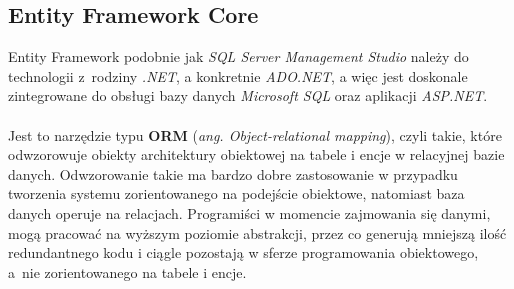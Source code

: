     \subsection{Entity Framework Core}
\quad Entity Framework podobnie jak \textit{SQL Server Management Studio} należy do technologii z~rodziny \textit{.NET}, a konkretnie \textit{ADO.NET}, a więc jest doskonale zintegrowane do obsługi bazy danych \textit{Microsoft SQL} oraz aplikacji \textit{ASP.NET}.
    \\
    \\
    Jest to narzędzie typu \textbf{ORM} (\textit{ang. Object-relational mapping}), czyli takie, które odwzorowuje obiekty architektury obiektowej na tabele i encje w relacyjnej bazie danych. Odwzorowanie takie ma bardzo dobre zastosowanie w przypadku tworzenia systemu zorientowanego na podejście obiektowe, natomiast baza danych operuje na relacjach. Programiści w momencie zajmowania się danymi, mogą pracować na wyższym poziomie abstrakcji, przez co generują mniejszą ilość redundantnego kodu i ciągle pozostają w sferze programowania obiektowego, a~nie zorientowanego na tabele i encje.